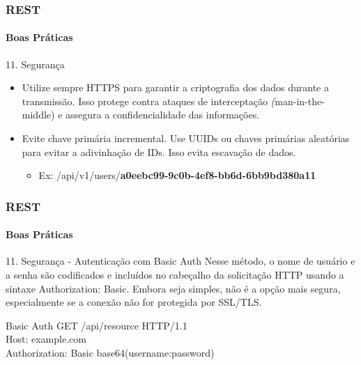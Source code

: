 \documentclass[
	9pt, %
	t, %
]{beamer}
\newcommand{\yellowbox}[1]{\colorbox{yellow!75}{#1}}
\begin{document}
\begin{frame}
	\frametitle{REST}
	\framesubtitle{Boas Práticas}

	\begin{block}{11. Segurança}
		\begin{itemize}
			\item Utilize sempre HTTPS para garantir a criptografia dos dados durante a
			      transmissão. Isso protege contra ataques de interceptação
			      \yellowbox{\textit(man-in-the-middle)} e assegura a confidencialidade das
			      informações.
			\item Evite chave primária incremental. Use UUIDs ou chaves primárias aleatórias para
			      evitar a adivinhação de IDs. Isso evita \yellowbox{escavação de dados}.
			      \begin{itemize}
				      \item Ex: /api/v1/users/\textbf{a0eebc99-9c0b-4ef8-bb6d-6bb9bd380a11}
			      \end{itemize}
		\end{itemize}
	\end{block}

\end{frame}

\begin{frame}
	\frametitle{REST}
	\framesubtitle{Boas Práticas}

	\begin{block}{11. Segurança - Autenticação com Basic Auth}
		Nesse método, o nome de usuário e a senha são codificados e incluídos no cabeçalho da solicitação HTTP usando a sintaxe \yellowbox{Authorization: Basic}. Embora seja simples, não é a opção mais segura, especialmente se a conexão não for protegida por SSL/TLS.
	\end{block}

	\begin{exampleblock}{Basic Auth}
		{ \small GET /api/resource HTTP/1.1 } \\
		{ \small Host: example.com } \\
		{ \small Authorization: Basic base64(username:password) } \\
	\end{exampleblock}

\end{frame}
\end{document}
